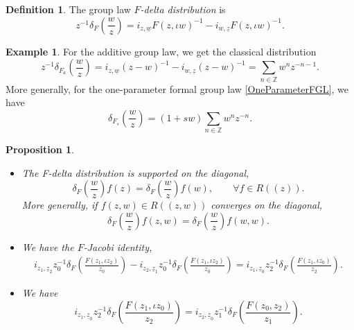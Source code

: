 \documentclass[pdftex]{sigma}
\numberwithin{equation}{section}
\newtheorem{Proposition}[Theorem]{Proposition}
\theoremstyle{definition}
\newtheorem{Definition}[Theorem]{Definition}
\newtheorem{Example}[Theorem]{Example}
\begin{document}

\begin{Definition}
 The group law \emph{$F$-delta distribution} is
 \[
 z^{-1}\delta_F\left(\frac{w}{z}\right) = i_{z,\underline w}F(z,\iota w)^{-1}-i_{w,\underline z}F(z,\iota w)^{-1}.
 \]
\end{Definition}

\begin{Example}
For the additive group law, we get the classical distribution
\begin{equation}
\label{ClassicalDelta}
 z^{-1}\delta_{F_a}\left(\frac{w}{z}\right)=i_{z,\underline w}(z-w)^{-1}-i_{w,\underline z}(z-w)^{-1}=\sum_{n\in\mathbb{Z}} w^nz^{-n-1}.
\end{equation}
More generally, for the one-parameter formal group law \eqref{OneParameterFGL}, we have
\[
 \delta_{F_s}\left(\frac{w}{z}\right)=(1+sw)\sum_{n\in\mathbb{Z}} w^nz^{-n}.
\]
\end{Example}

\begin{Proposition}\quad
\label{PropJacobiDelta}
\begin{itemize}\itemsep=0pt
\item[$(a)$]
 The F-delta distribution is supported on the diagonal,
 \begin{equation}
 \label{DiagonalSupport}
 \delta_F\left(\frac{w}{z}\right)f(z)=\delta_F\left(\frac{w}{z}\right)f(w),\qquad\forall f\in R(\!( z)\!).
 \end{equation}
 More generally, if $f(z,w)\in R(\!( z,w)\!)$ converges on the diagonal,
 \begin{equation}
 \label{DiagonalSupport2}
 \delta_F\left(\frac{w}{z}\right)f(z,w)=\delta_F\left(\frac{w}{z}\right)f(w,w).
 \end{equation}
 \item[$(2)$]
 We have the \emph{$F$-Jacobi identity},
 \begin{gather*}
 i_{z_1,\underline z_2}z_0^{-1}\delta_F\left(\frac{F(z_1,\iota z_2)}{z_0}\right)
 -i_{z_2,\underline z_1}z_0^{-1}\delta_F\left(\frac{F(z_1,\iota z_2)}{z_0}\right)
 =i_{z_1,\underline z_0}z_2^{-1}\delta_F\left(\frac{F(z_1,\iota z_0)}{z_2}\right).
 \end{gather*}
 \item[$(3)$]
 We have
 \[
 i_{z_1,\underline z_0}z_2^{-1}\delta_F\left(\frac{F(z_1,\iota z_0)}{z_2}\right)
 =i_{z_2,\underline z_0}z_1^{-1}\delta_F\left(\frac{F(z_0,z_2)}{z_1}\right).
 \]
 \end{itemize}
\end{Proposition}
\end{document}
